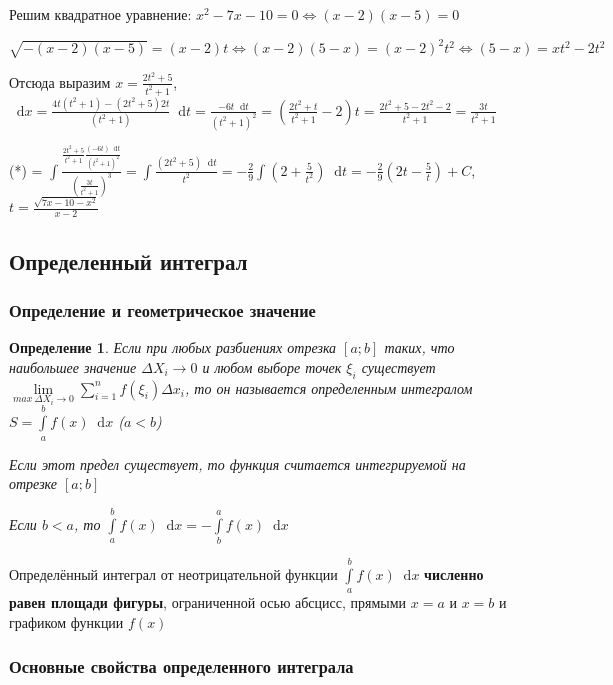 \documentclass{article}
\newcommand*\diff{\mathop{}\!\mathrm{d}}
\newtheorem{definition}{Определение}
\begin{document}
\hfill

Решим квадратное уравнение: $x^2 - 7x - 10 = 0 \Longleftrightarrow (x - 2)(x - 5) = 0$

$\sqrt{-(x - 2)(x - 5)} = (x - 2) t \Longleftrightarrow (x - 2) (5 - x) = (x - 2)^2 t^2 \Longleftrightarrow (5 - x) = x t^2 - 2t^2$

Отсюда выразим $x = \frac{2t^2 + 5}{t^2 + 1}$, $\diff x = \frac{4t (t^2 + 1) - (2t^2 + 5) 2 t}{(t^2 + 1)} \diff t = \frac{-6 t \diff t}{(t^2 + 1)^2} = (\frac{2t^2 + t}{t^2 + 1} - 2) t = \frac{2t^2 + 5 - 2t^2 - 2}{t^2 + 1} = \frac{3t}{t^2 + 1}$

\hfill

(*) = $\int \frac{\frac{2t^2 + 5}{t^2 + 1} \frac{(-6t) \diff t}{(t^2 + 1)^2}}{(\frac{3t}{t^2 + 1})^3} = \int \frac{(2t^2 + 5) \diff t}{t^2} = -\frac{2}{9} \int (2 + \frac{5}{t^2}) \diff t = - \frac{2}{9} (2t - \frac{5}{t}) + C$, \ $t = \frac{\sqrt{7x-10-x^2}}{x-2}$

\subsection{Определенный интеграл}

\subsubsection{Определение и геометрическое значение}

\begin{definition}
    Если при любых разбиениях отрезка $[a; b]$ таких, что наибольшее значение $\Delta X_{i} \to 0$ и любом выборе точек $\xi_{i}$ существует $\lim\limits_{max \ \Delta X_{i} \to 0} \sum\limits_{i = 1}^{n} f(\xi_{i}) \Delta x_{i}$, то он называется определенным интегралом $S = \int\limits_{a}^{b} f(x) \diff x$ ($a < b$)

    Если этот предел существует, то функция считается интегрируемой на отрезке $[a; b]$

    Если $b < a$, то $\int\limits^{b}_{a} f(x) \diff x = - \int\limits_b^{a} f(x) \diff x$
\end{definition}

Определённый интеграл от неотрицательной функции $\int\limits_{a}^{b} f(x) \diff x$ \textbf{численно равен площади фигуры}, ограниченной осью абсцисс, прямыми $x = a$ и $x = b$ и графиком функции $f(x)$

\subsubsection{Основные свойства определенного интеграла}
\end{document}
